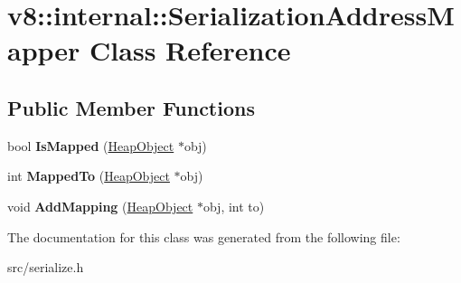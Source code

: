 \hypertarget{classv8_1_1internal_1_1_serialization_address_mapper}{}\section{v8\+:\+:internal\+:\+:Serialization\+Address\+Mapper Class Reference}
\label{classv8_1_1internal_1_1_serialization_address_mapper}
\subsection*{Public Member Functions}
\begin{DoxyCompactItemize}
\item 
\hypertarget{classv8_1_1internal_1_1_serialization_address_mapper_a99eedd2a33a05268e218882a800c9cd2}{}bool {\bfseries Is\+Mapped} (\hyperlink{classv8_1_1internal_1_1_heap_object}{Heap\+Object} $\ast$obj)\label{classv8_1_1internal_1_1_serialization_address_mapper_a99eedd2a33a05268e218882a800c9cd2}

\item 
\hypertarget{classv8_1_1internal_1_1_serialization_address_mapper_a8ea3381a8639866f058ff3af9e2d01ae}{}int {\bfseries Mapped\+To} (\hyperlink{classv8_1_1internal_1_1_heap_object}{Heap\+Object} $\ast$obj)\label{classv8_1_1internal_1_1_serialization_address_mapper_a8ea3381a8639866f058ff3af9e2d01ae}

\item 
\hypertarget{classv8_1_1internal_1_1_serialization_address_mapper_ab1a724ef586c9942144cd08cdee661bb}{}void {\bfseries Add\+Mapping} (\hyperlink{classv8_1_1internal_1_1_heap_object}{Heap\+Object} $\ast$obj, int to)\label{classv8_1_1internal_1_1_serialization_address_mapper_ab1a724ef586c9942144cd08cdee661bb}

\end{DoxyCompactItemize}


The documentation for this class was generated from the following file\+:\begin{DoxyCompactItemize}
\item 
src/serialize.\+h\end{DoxyCompactItemize}
